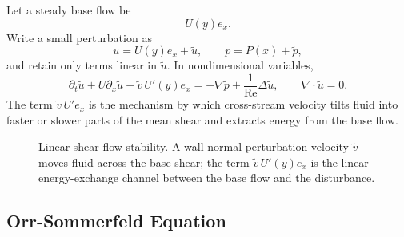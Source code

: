 Let a steady base flow be
\[
  U(y)e_x.
\]
Write a small perturbation as
\[
  u=U(y)e_x+\tilde u,\qquad
  p=P(x)+\tilde p,
\]
and retain only terms linear in \(\tilde u\). In nondimensional variables,
\[
  \boxed{
  \partial_t\tilde u
  +
  U\partial_x\tilde u
  +
  \tilde v\,U'(y)e_x
  =
  -\nabla\tilde p
  +
  \frac1{\mathrm{Re}}\Delta\tilde u,
  \qquad
  \nabla\cdot\tilde u=0.
  }
\]
The term \(\tilde v\,U'e_x\) is the mechanism by which cross-stream velocity
tilts fluid into faster or slower parts of the mean shear and extracts energy
from the base flow.

\begin{figure}[htbp]
\centering
{}
\caption{Linear shear-flow stability. A wall-normal perturbation velocity
\(\tilde v\) moves fluid across the base shear; the term
\(\tilde v\,U'(y)e_x\) is the linear energy-exchange channel between the base
flow and the disturbance.}
\label{fig:shear-stability-mechanism}
\end{figure}

\subsection{Orr-Sommerfeld Equation}
\label{subsec:orr-sommerfeld}

